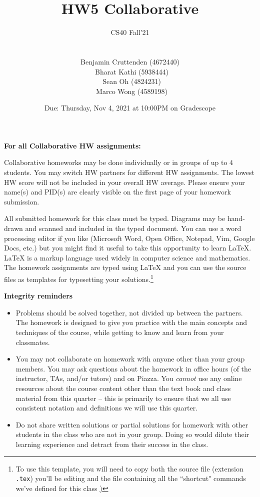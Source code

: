 \documentclass[12pt, oneside]{article}
\title{HW5 Collaborative}
\author{CS40 Fall'21\\\\\\
Benjamin Cruttenden (4672440)\\\
Bharat Kathi (5938444)\\\
Sean Oh (4824231)\\\
Marco Wong (4589198)}
\date{Due: Thursday, Nov 4, 2021 at 10:00PM on Gradescope}
\begin{document}
\maketitle

{\bf For all Collaborative HW assignments:}

Collaborative homeworks may be done individually or in groups of up to 4 students. You may switch HW partners for different HW assignments. The lowest HW score will not be included in your overall HW average. Please ensure your name(s) and PID(s) are clearly visible on the first page of your homework submission.

All submitted homework for this class must be typed. Diagrams may be hand-drawn and scanned and included in the typed document. You can use a word processing editor if you like (Microsoft Word, Open Office, Notepad, Vim, Google Docs, etc.) but you might find it useful to take this opportunity to learn LaTeX. LaTeX is a markup language used widely in computer science and mathematics. The homework assignments are typed using LaTeX and you can use the source files as templates for typesetting your solutions.\footnote{To use this template, you will need to copy both the source file (extension \texttt{.tex})  you'll be editing
and the file containing all the ``shortcut" commands we've defined for this class \href{https://drive.google.com/file/d/1FmQvgByKnNjTpIkAUw31TGWYrQZM-HK0/view?usp=sharing})}


{\bf Integrity reminders}
\begin{itemize}
\item Problems should be solved together, not divided up between the partners. The homework is
designed to give you practice with the main concepts and techniques of the course, while getting to know and learn from your classmates.
\item You may not collaborate on homework with anyone other than your group members.
You may ask questions about the homework in office hours (of the instructor, TAs, and/or tutors) and 
on Piazza.  You \emph{cannot} use any online resources about the course content other than the text
book and class material from this quarter -- this is primarily to ensure that we all use consistent notation and
definitions we will use this quarter.
\item Do not share written solutions or partial solutions for homework with other students in the class who are not in your group. Doing so would dilute their learning experience and detract from their success in the class.
\end{itemize}
\end{document}
